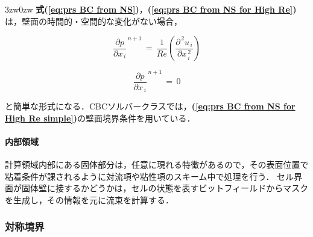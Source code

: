 \begin{indentation}{3zw}{0zw}
\noindent \textbf{式(\ref{eq:prs BC from NS})}，\textbf{(\ref{eq:prs BC from NS for High Re})}は，壁面の時間的・空間的な変化がない場合，

\begin{equation}
{\frac{\partial p}{\partial x_{\,i}}}^{\,n+1} \,=\, 
\frac{1}{Re} \left( \frac{\partial^{\,2} u_{\,i}}{\partial x_{\,i}^{\,2}} \right)
\label{eq:prs BC from NS for Low Re simple}
\end{equation}

\begin{equation}
{\frac{\partial p}{\partial x_{\,i}}}^{\,n+1} \,=\, 0
\label{eq:prs BC from NS for High Re simple}
\end{equation}


\noindent と簡単な形式になる．CBCソルバークラスでは，\textbf{(\ref{eq:prs BC from NS for High Re simple})}の壁面境界条件を用いている．

\vspace{5mm}
\paragraph{内部領域}
計算領域内部にある固体部分は，任意に現れる特徴があるので，その表面位置で粘着条件が課されるように対流項や粘性項のスキーム中で処理を行う．
セル界面が固体壁に接するかどうかは，セルの状態を表すビットフィールドからマスクを生成し，その情報を元に流束を計算する．
\end{indentation}

\pagebreak
%
\subsubsection{対称境界}
\label{sec:BC symmetric}

